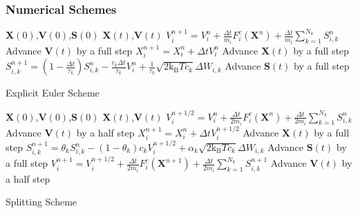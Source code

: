 \documentclass[a4paper,10pt]{beamer}
\newcommand{\BS}[1]{\boldsymbol{#1}}
\newcommand{\rb}[1]{\left( #1 \right)}
\begin{document}
	\begin{frame}
		\frametitle{Numerical Schemes}
			\vspace{-0.3cm}
			\begin{algorithm}[H]
				\scriptsize
				\renewcommand{\algorithmicrequire}{\textbf{Input:}}
				\renewcommand{\algorithmicensure}{\textbf{Output:}}
				\begin{algorithmic}[1]
					\Require $\BS{X}(0)$,$\BS{V}(0)$,$\BS{S}(0)$
					\Ensure $\BS{X}(t)$,$\BS{V}(t)$
					\tiny
						\State $V_{i}^{n+1} = V_{i}^{n} + \frac{\Delta t}{m_{i}} F_{i}^{c} \rb{\BS{X}^{n}}+\frac{\Delta t}{m_{i}} \sum_{k=1}^{N_{k}}S_{i,k}^{n}$
						\Comment Advance $\BS{V}(t)$ by a full step
						\State $X_{i}^{n+1} = X_{i}^{n} + \Delta t V_{i}^{n}$
						\Comment Advance $\BS{X}(t)$ by a full step
						\State $S_{i,k}^{n+1} = \rb{1-\frac{\Delta t}{\tau_{k}}}S_{i,k}^{n}-\frac{c_{k}\Delta t}{\tau_{k}}V_{i}^{n} + \frac{1}{\tau_{k}}\sqrt{2 \text{k}_{\text{B}} T c_{k}}\Delta W_{i,k}$
						\Comment Advance $\BS{S}(t)$ by a full step
					\scriptsize
					\EndFor
				\end{algorithmic}
				\caption*{Explicit Euler Scheme}
			\end{algorithm}
			\vspace{-0.75cm}
			\begin{algorithm}[H]
				\scriptsize
				\renewcommand{\algorithmicrequire}{\textbf{Input:}}
				\renewcommand{\algorithmicensure}{\textbf{Output:}}
				\begin{algorithmic}[1]
					\Require $\BS{X}(0)$,$\BS{V}(0)$,$\BS{S}(0)$
					\Ensure $\BS{X}(t)$,$\BS{V}(t)$
					\tiny
					\State $V_{i}^{n+1/2} = V_{i}^{n} + \frac{\Delta t}{2m_{i}} F_{i}^{c} \rb{\BS{X}^{n}}+\frac{\Delta t}{2m_{i}} \sum_{k=1}^{N_{k}}S_{i,k}^{n}$
					\Comment Advance $\BS{V}(t)$ by a half step
					\State $X_{i}^{n+1} = X_{i}^{n} + \Delta t V_{i}^{n+1/2}$
					\Comment Advance $\BS{X}(t)$ by a full step
					\State $S_{i,k}^{n+1} = \theta_{k} S_{i,k}^{n}-\rb{1-\theta_{k}}c_{k}V_{i}^{n+1/2} + \alpha_{k}\sqrt{2 \text{k}_{\text{B}} T c_{k}}\Delta W_{i,k}$
					\Comment Advance $\BS{S}(t)$ by a full step
					\State $V_{i}^{n+1} = V_{i}^{n+1/2} + \frac{\Delta t}{2m_{i}} F_{i}^{c} \rb{\BS{X}^{n+1}}+\frac{\Delta t}{2m_{i}} \sum_{k=1}^{N_{k}}S_{i,k}^{n+1}$
					\Comment Advance $\BS{V}(t)$ by a half step
					\scriptsize
					\EndFor
				\end{algorithmic}
				\caption*{Splitting Scheme}
			\end{algorithm}
	\end{frame}
\end{document}
